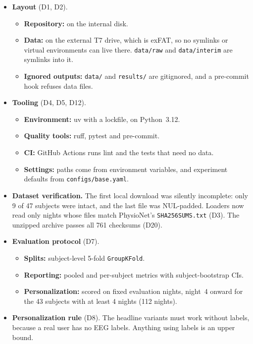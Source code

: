 \documentclass[11pt,a4paper]{article}
\newcommand{\code}[1]{\texttt{#1}}
\newcommand{\D}[1]{D#1}
\begin{document}
\begin{itemize}
\item \textbf{Layout} (\D{1}, \D{2}).
  \begin{itemize}
  \item \textbf{Repository:} on the internal disk.
  \item \textbf{Data:} on the external T7 drive, which is exFAT, so no symlinks or virtual
  environments can live there. \code{data/raw} and \code{data/interim} are symlinks into it.
  \item \textbf{Ignored outputs:} \code{data/} and \code{results/} are gitignored, and a
  pre-commit hook refuses data files.
  \end{itemize}
\item \textbf{Tooling} (\D{4}, \D{5}, \D{12}).
  \begin{itemize}
  \item \textbf{Environment:} uv with a lockfile, on Python~3.12.
  \item \textbf{Quality tools:} ruff, pytest and pre-commit.
  \item \textbf{CI:} GitHub Actions runs lint and the tests that need no data.
  \item \textbf{Settings:} paths come from environment variables, and experiment defaults from
  \code{configs/base.yaml}.
  \end{itemize}
\item \textbf{Dataset verification.} The first local download was silently incomplete: only 9 of
47 subjects were intact, and the last file was NUL-padded. Loaders now read only nights whose
files match PhysioNet's \code{SHA256SUMS.txt} (\D{3}). The unzipped archive passes all 761
checksums (\D{20}).
\item \textbf{Evaluation protocol} (\D{7}).
  \begin{itemize}
  \item \textbf{Splits:} subject-level 5-fold \code{GroupKFold}.
  \item \textbf{Reporting:} pooled and per-subject metrics with subject-bootstrap CIs.
  \item \textbf{Personalization:} scored on fixed evaluation nights, night~4 onward for the 43
  subjects with at least 4 nights (112 nights).
  \end{itemize}
\item \textbf{Personalization rule} (\D{8}). The headline variants must work without labels,
because a real user has no EEG labels. Anything using labels is an upper bound.
\end{itemize}
\end{document}
